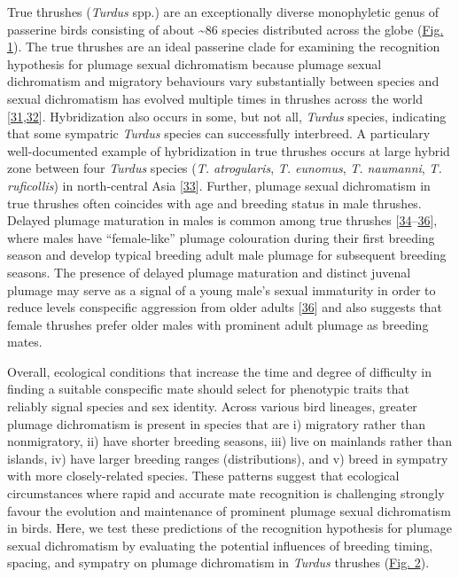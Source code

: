 \documentclass[
  a4paper,
]{article}
\begin{document}
True thrushes (\emph{Turdus} spp.) are an exceptionally diverse
monophyletic genus of passerine birds consisting of about
\textasciitilde86 species distributed across the globe
(\protect\hyperlink{fig:fig-01-turdus-ranges}{Fig. 1}). The true
thrushes are an ideal passerine clade for examining the recognition
hypothesis for plumage sexual dichromatism because plumage sexual
dichromatism and migratory behaviours vary substantially between species
and sexual dichromatism has evolved multiple times in thrushes across
the world
{[}\protect\hyperlink{ref-clement2000}{31},\protect\hyperlink{ref-nagy2019}{32}{]}.
Hybridization also occurs in some, but not all, \emph{Turdus} species,
indicating that some sympatric \emph{Turdus} species can successfully
interbreed. A particulary well-documented example of hybridization in
true thrushes occurs at large hybrid zone between four \emph{Turdus}
species (\emph{T. atrogularis}, \emph{T. eunomus}, \emph{T. naumanni},
\emph{T. ruficollis}) in north-central Asia
{[}\protect\hyperlink{ref-mccarthy2006}{33}{]}. Further, plumage sexual
dichromatism in true thrushes often coincides with age and breeding
status in male thrushes. Delayed plumage maturation in males is common
among true thrushes
{[}\protect\hyperlink{ref-escalona-segura1997}{34}--\protect\hyperlink{ref-ligon2013}{36}{]},
where males have ``female-like'' plumage colouration during their first
breeding season and develop typical breeding adult male plumage for
subsequent breeding seasons. The presence of delayed plumage maturation
and distinct juvenal plumage may serve as a signal of a young male's
sexual immaturity in order to reduce levels conspecific aggression from
older adults {[}\protect\hyperlink{ref-ligon2013}{36}{]} and also
suggests that female thrushes prefer older males with prominent adult
plumage as breeding mates.

Overall, ecological conditions that increase the time and degree of
difficulty in finding a suitable conspecific mate should select for
phenotypic traits that reliably signal species and sex identity. Across
various bird lineages, greater plumage dichromatism is present in
species that are i) migratory rather than nonmigratory, ii) have shorter
breeding seasons, iii) live on mainlands rather than islands, iv) have
larger breeding ranges (distributions), and v) breed in sympatry with
more closely-related species. These patterns suggest that ecological
circumstances where rapid and accurate mate recognition is challenging
strongly favour the evolution and maintenance of prominent plumage
sexual dichromatism in birds. Here, we test these predictions of the
recognition hypothesis for plumage sexual dichromatism by evaluating the
potential influences of breeding timing, spacing, and sympatry on
plumage dichromatism in \emph{Turdus} thrushes
(\protect\hyperlink{fig:fig:02-hypotheses}{Fig. 2}).
\end{document}
